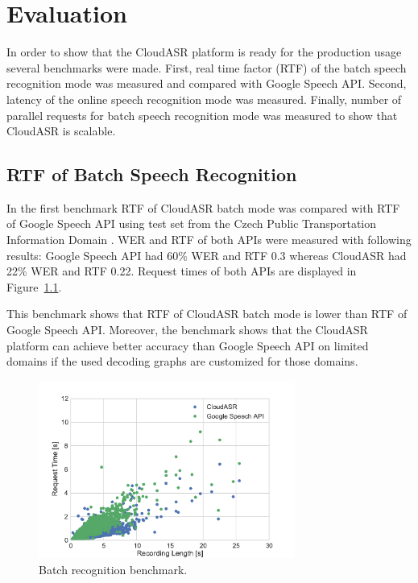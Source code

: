 \chapter{Evaluation}\label{chapter:evaluation}
In order to show that the CloudASR platform is ready for the production usage
  several benchmarks were made.
First, real time factor (RTF) of the batch speech recognition mode was measured and compared with Google Speech API.
Second, latency of the online speech recognition mode was measured.
Finally, number of parallel requests for batch speech recognition mode was measured to show that CloudASR is scalable.


\section{RTF of Batch Speech Recognition}
In the first benchmark RTF of CloudASR batch mode was compared with RTF of Google Speech API
  using test set from the Czech Public Transportation Information Domain \cite{korvas2014vystadial}.
WER and RTF of both APIs were measured with following results:
Google Speech API had 60\% WER and RTF 0.3 whereas
  CloudASR had 22\% WER and RTF 0.22.
Request times of both APIs are displayed in Figure~\ref{fig:batch-benchmark}.

This benchmark shows that RTF of CloudASR batch mode is lower than RTF of Google Speech API.
Moreover, the benchmark shows that the CloudASR platform can achieve better accuracy than Google Speech API on limited domains
  if the used decoding graphs are customized for those domains.


\begin{figure}[h]
  \centering
  \includegraphics[width=0.75\textwidth]{./img/batch.pdf}

  \caption{
    Batch recognition benchmark.
  }
  \label{fig:batch-benchmark}
\end{figure}




